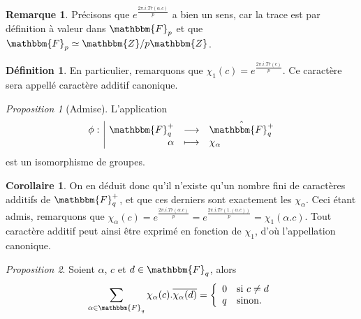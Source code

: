 \documentclass[12pt]{article}
\newcommand{\fonction}[5]{
\begin{displaymath}
\begin{array}{l|rcl}
\displaystyle
#1 : & #2 & \longrightarrow & #3 \\
    & #4 & \longmapsto & #5
\end{array}
\end{displaymath}
}
\theoremstyle{remark}\newtheorem{note}{Note}
\theoremstyle{remark}\newtheorem{nota}{Notation}
\newcommand{\Z}{\mathbbm{Z}}
\newcommand{\Fq}{\mathbbm{F}_q}
\newcommand{\Fp}{\mathbbm{F}_p}
\newtheorem{prop}{Proposition}
\theoremstyle{definition}
\newtheorem{definition}{Définition}
\newtheorem{coro}{Corollaire}
\newtheorem{rem}{Remarque}
\begin{document}
\begin{rem}
Précisons que $e^{\frac{2\pi.i.Tr(\alpha.c)}{p}}$ a bien un sens, car la trace est par définition à valeur dans $\Fp$ et que $\Fp \simeq \Z / p\Z$.
\end{rem}

\begin{definition}
En particulier, remarquons que $\chi_1(c) = e^{\frac{2\pi.i.Tr(c)}{p}}$. Ce caractère sera appellé caractère additif canonique.
\end{definition}

\begin{prop}[Admise]
L'application \fonction{\phi}{\Fq^+}{\hat{\Fq^+}}{\alpha}{\chi_\alpha} est un isomorphisme de groupes.
\end{prop}

\begin{coro}
On en déduit donc qu'il n'existe qu'un nombre fini de caractères additifs de $\Fq^+$, et que ces derniers sont exactement les $\chi_\alpha$. Ceci étant admis, remarquons que $\chi_\alpha(c) = e^{\frac{2\pi.i.Tr(\alpha.c)}{p}} = e^{\frac{2\pi.i.Tr(1.(\alpha.c))}{p}} = \chi_1(\alpha.c)$. Tout caractère additif peut ainsi être exprimé en fonction de $\chi_1$, d'où l'appellation canonique.
\end{coro}

\begin{prop}
Soient $\alpha$, $c$ et $d \in \Fq$, alors
$$
\displaystyle\sum_{\alpha \in \Fq}\chi_\alpha(c).\overline{\chi_\alpha(d)} = \left\{
    \begin{array}{ll}
        0 & \mbox{si } c \ne d \\
        q & \mbox{sinon.}
    \end{array}
\right.
$$
\end{prop}
\end{document}
